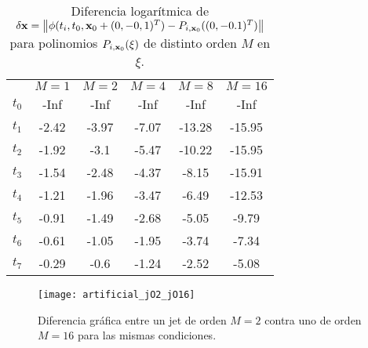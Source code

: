 \begin{table}[h!]
\centering
\begin{tabular}{c|ccccc}
\toprule
               & \textbf{$ M = 1 $} & \textbf{$M = 2 $} & \textbf{$ M = 4$} & \textbf{$ M = 8 $} & \textbf{$ M = 16 $} \\ \cmidrule(l){1-6} 
\textbf{$t_0$} & -Inf                       & -Inf                       & -Inf                       & -Inf                       & -Inf                          \\
\textbf{$t_1$} & -2.42                      & -3.97                      & -7.07                      & -13.28                     & -15.95                        \\
\textbf{$t_2$} & -1.92                      & -3.1                       & -5.47                      & -10.22                     & -15.95                        \\
\textbf{$t_3$} & -1.54                      & -2.48                      & -4.37                      & -8.15                      & -15.91                        \\
\textbf{$t_4$} & -1.21                      & -1.96                      & -3.47                      & -6.49                      & -12.53                        \\
\textbf{$t_5$} & -0.91                      & -1.49                      & -2.68                      & -5.05                      & -9.79                         \\
\textbf{$t_6$} & -0.61                      & -1.05                      & -1.95                      & -3.74                      & -7.34                         \\
\textbf{$t_7$} & -0.29                      & -0.6                       & -1.24                      & -2.52                      & -5.08                         \\ \bottomrule 
\end{tabular}
\caption{Diferencia logarítmica de $\delta \mathbf{x} = \left\lVert \phi(t_i,t_0,\mathbf{x}_0 + (0,-0,1)^T) - P_{i,\mathbf{x}_0}((0,-0.1)^T) \right\rVert$ para polinomios $P_{i,\mathbf{x}_0}(\xi)$ de distinto orden $M$ en $\xi$.}
\label{table:djet_artificial}
\end{table}

\begin{figure}[h!]
 \centering
 \texttt{[image: artificial\_jO2\_jO16]}
 \caption{Diferencia gráfica entre un jet de orden $M=2$ contra uno de orden $M=16$ para las mismas condiciones.}
 \label{fig:artificial_jO2_jO16}
\end{figure}

